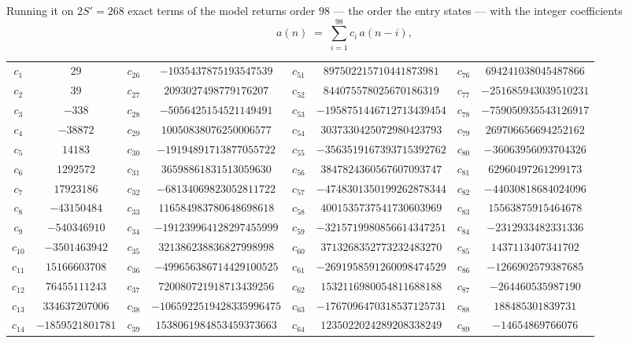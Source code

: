 \documentclass[11pt,a4paper]{article}
\theoremstyle{plain}
\theoremstyle{definition}
\begin{document}
Running it on $2S'=268$ exact terms of the model returns order $98$ --- the order the
entry states --- with the integer coefficients
\[
a(n)\;=\;\sum_{i=1}^{98}c_i\,a(n-i),
\]
\begin{center}\small
\begin{tabular}{cccccccc}
$c_{1}$ & $29$ & $c_{26}$ & $-1035437875193547539$ & $c_{51}$ & $897502215710441873981$ & $c_{76}$ & $694241038045487866$ \\
$c_{2}$ & $39$ & $c_{27}$ & $2093027498779176207$ & $c_{52}$ & $844075578025670186319$ & $c_{77}$ & $-251685943039510231$ \\
$c_{3}$ & $-338$ & $c_{28}$ & $-5056425154521149491$ & $c_{53}$ & $-1958751446712713439454$ & $c_{78}$ & $-759050935543126917$ \\
$c_{4}$ & $-38872$ & $c_{29}$ & $10050838076250006577$ & $c_{54}$ & $3037330425072980423793$ & $c_{79}$ & $269706656694252162$ \\
$c_{5}$ & $14183$ & $c_{30}$ & $-19194891713877055722$ & $c_{55}$ & $-3563519167393715392762$ & $c_{80}$ & $-36063956093704326$ \\
$c_{6}$ & $1292572$ & $c_{31}$ & $36598861831513059630$ & $c_{56}$ & $3847824360567607093747$ & $c_{81}$ & $62960497261299173$ \\
$c_{7}$ & $17923186$ & $c_{32}$ & $-68134069823052811722$ & $c_{57}$ & $-4748301350199262878344$ & $c_{82}$ & $-44030818684024096$ \\
$c_{8}$ & $-43150484$ & $c_{33}$ & $116584983780648698618$ & $c_{58}$ & $4001535737541730603969$ & $c_{83}$ & $15563875915464678$ \\
$c_{9}$ & $-540346910$ & $c_{34}$ & $-191239964128297455999$ & $c_{59}$ & $-3215719980856614347251$ & $c_{84}$ & $-2312933482331336$ \\
$c_{10}$ & $-3501463942$ & $c_{35}$ & $321386238836827998998$ & $c_{60}$ & $3713268352773232483270$ & $c_{85}$ & $1437113407341702$ \\
$c_{11}$ & $15166603708$ & $c_{36}$ & $-499656386714429100525$ & $c_{61}$ & $-2691958591260098474529$ & $c_{86}$ & $-1266902579387685$ \\
$c_{12}$ & $76455111243$ & $c_{37}$ & $720080721918713439256$ & $c_{62}$ & $1532116980054811688188$ & $c_{87}$ & $-264460535987190$ \\
$c_{13}$ & $334637207006$ & $c_{38}$ & $-1065922519428335996475$ & $c_{63}$ & $-1767096470318537125731$ & $c_{88}$ & $188485301839731$ \\
$c_{14}$ & $-1859521801781$ & $c_{39}$ & $1538061984853459373663$ & $c_{64}$ & $1235022024289208338249$ & $c_{89}$ & $-14654869766076$ \\

\end{tabular}
\end{center}
\end{document}
